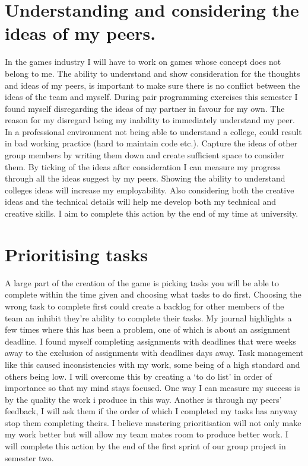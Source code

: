 \documentclass{scrartcl}
\begin{document}
\section{Understanding and considering the ideas of my peers.}
In the games industry I will have to work on games whose  concept does not belong to me. The ability to understand and show consideration for the thoughts and ideas of my peers, is important to make sure there is no conflict between the ideas of the team and myself. During pair programming exercises this semester I found myself disregarding the ideas of my partner in favour for my own. The reason for my disregard being my inability to immediately understand my peer. In a professional environment not being able to understand a college, could result in bad working practice (hard to maintain code etc.). Capture the ideas of other group members by writing them down and create sufficient space to consider them. By ticking of the ideas after consideration I can measure my progress through all the ideas suggest by my peers. Showing the ability to understand colleges ideas will increase my employability. Also considering both the creative ideas and the technical details will help me develop both my technical and creative skills. I aim to complete this action by the end of my time at university. 

\section{Prioritising tasks}
A large part of the creation of the game is picking tasks you will be able to complete within the time given and choosing what tasks to do first. Choosing the wrong task to complete first could create a backlog for other members of the team an inhibit they're ability to complete their tasks. My journal highlights a few times where this has been a problem, one of which is about an assignment deadline. I found myself completing assignments with deadlines that were weeks away to the exclusion of assignments with deadlines days away. Task management like this caused inconsistencies with my work, some being of a high standard and others being low. I will overcome this by creating a `to do list' in order of importance so that my mind stays focused. One way I can measure my success is by the quality the work i produce in this way. Another is through my peers' feedback, I will ask them if the order of which I completed my tasks has anyway stop them completing theirs. I believe mastering prioritisation will not only make my work better but will allow my team mates room to produce better work. I will complete this action by the end of the first sprint of our group project in semester two.
\end{document}

